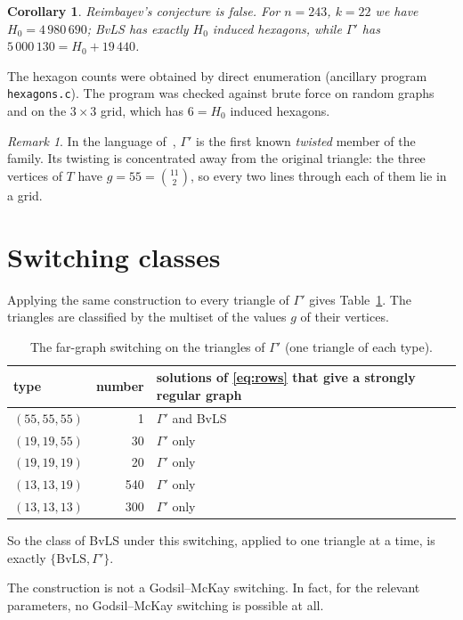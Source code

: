 \documentclass[11pt]{amsart}
\newtheorem{corollary}[theorem]{Corollary}
\theoremstyle{remark}
\newtheorem{remark}[theorem]{Remark}
\begin{document}
\begin{corollary}\label{cor:rei}
Reimbayev's conjecture is false. For $n=243$, $k=22$ we have $H_0=4\,980\,690$; BvLS has exactly $H_0$ induced hexagons,
while $\Gamma'$ has $5\,000\,130=H_0+19\,440$.
\end{corollary}
The hexagon counts were obtained by direct enumeration (ancillary program \texttt{hexagons.c}). The program was checked
against brute force on random graphs and on the $3\times3$ grid, which has $6=H_0$ induced hexagons.

\begin{remark}
In the language of~\cite{Mak}, $\Gamma'$ is the first known \emph{twisted} member of the family. Its twisting is concentrated away from the original triangle: the three vertices of $T$ have $g=55=\binom{11}{2}$, so every two lines through each of them lie in a grid.
\end{remark}

\section{Switching classes}
Applying the same construction to every triangle of $\Gamma'$ gives Table~\ref{tab:types}. The triangles are classified
by the multiset of the values $g$ of their vertices.

\begin{table}[ht]
\centering
\caption{The far-graph switching on the triangles of $\Gamma'$ (one triangle of each type).}
\label{tab:types}
\begin{tabular}{lrl}
\toprule
type & number & solutions of \eqref{eq:rows} that give a strongly regular graph\\
\midrule
$(55,55,55)$ & 1 & $\Gamma'$ and BvLS\\
$(19,19,55)$ & 30 & $\Gamma'$ only\\
$(19,19,19)$ & 20 & $\Gamma'$ only\\
$(13,13,19)$ & 540 & $\Gamma'$ only\\
$(13,13,13)$ & 300 & $\Gamma'$ only\\
\bottomrule
\end{tabular}
\end{table}

So the class of BvLS under this switching, applied to one triangle at a time, is exactly $\{\mathrm{BvLS},\Gamma'\}$.

The construction is not a Godsil--McKay switching. In fact, for the relevant parameters, no Godsil--McKay switching is
possible at all.
\end{document}
